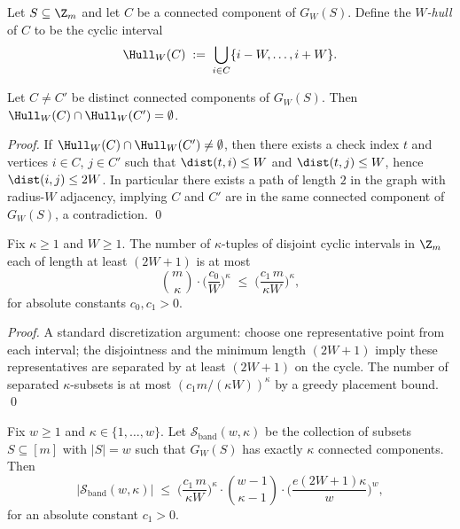 \begin{definition}
\label{def:W-hulls}
Let $S\subseteq \Z_m$ and let $C$ be a connected component of $G_W(S)$.
Define the \emph{$W$-hull} of $C$ to be the cyclic interval
\[
\Hull_W(C)\;:=\;\bigcup_{i\in C}\{i-W,\dots,i+W\}.
\]
\end{definition}

\begin{lemma}
\label{lem:hulls-disjoint}
Let $C\neq C'$ be distinct connected components of $G_W(S)$.
Then $\Hull_W(C)\cap \Hull_W(C')=\emptyset$.
\end{lemma}

\begin{proof}
If $\Hull_W(C)\cap \Hull_W(C')\neq\emptyset$, then there exists a check index $t$ and vertices $i\in C$, $j\in C'$ such
that $\dist(t,i)\le W$ and $\dist(t,j)\le W$, hence $\dist(i,j)\le 2W$.
In particular there exists a path of length $2$ in the graph with radius-$W$ adjacency, implying $C$ and $C'$ are in the
same connected component of $G_W(S)$, a contradiction.
\qed
\end{proof}

\begin{lemma}
\label{lem:count-separated-placements}
Fix $\kappa\ge 1$ and $W\ge 1$.
The number of $\kappa$-tuples of disjoint cyclic intervals in $\Z_m$ each of length at least $(2W+1)$ is at most
\[
\binom{m}{\kappa}\cdot \Big(\frac{c_0}{W}\Big)^{\kappa}
\;\le\;
\Big(\frac{c_1\,m}{\kappa W}\Big)^{\kappa},
\]
for absolute constants $c_0,c_1>0$.
\end{lemma}

\begin{proof}
A standard discretization argument: choose one representative point from each interval; the disjointness and the minimum
length $(2W+1)$ imply these representatives are separated by at least $(2W+1)$ on the cycle.
The number of separated $\kappa$-subsets is at most $(c_1 m/(\kappa W))^\kappa$ by a greedy placement bound.
\qed
\end{proof}

\begin{lemma}
\label{lem:count-by-components-banded}
Fix $w\ge 1$ and $\kappa\in\{1,\dots,w\}$.
Let $\mathcal S_{\mathrm{band}}(w,\kappa)$ be the collection of subsets $S\subseteq [m]$ with $|S|=w$ such that
$G_W(S)$ has exactly $\kappa$ connected components.
Then
\[
|\mathcal S_{\mathrm{band}}(w,\kappa)|
\;\le\;
\Big(\frac{c_1\,m}{\kappa W}\Big)^{\kappa}\cdot
\binom{w-1}{\kappa-1}\cdot
\Big(\frac{e(2W+1)\kappa}{w}\Big)^{w},
\]
for an absolute constant $c_1>0$.
\end{lemma}

